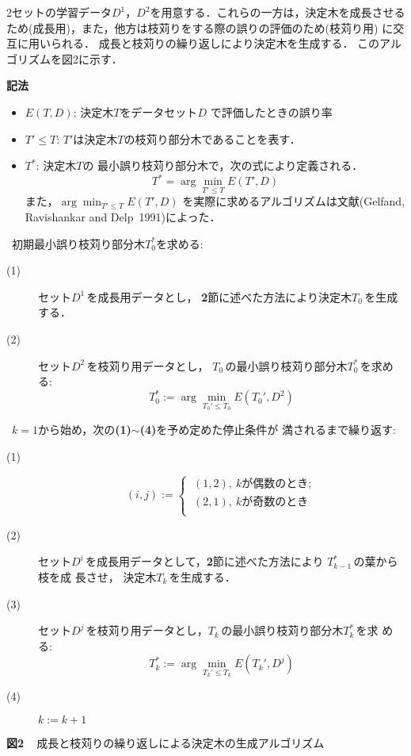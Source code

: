 2セットの学習データ$D^1$，$D^2$を用意する．これらの一方は，決定木を成長させる
ため(成長用)，また，他方は枝苅りをする際の誤りの評価のため(枝苅り用)
に交互に用いられる．
成長と枝苅りの繰り返しにより決定木を生成する．
このアルゴリズムを図2に示す．
\begin{table}
{\bf 記法}
\begin{itemize}
\item $E(T,D)$: 決定木$T$をデータセット$D$
で評価したときの誤り率
\item $T'\leq  T$: $T'$は決定木$T$の枝苅り部分木であることを表す．
\item $T^*$: 
決定木$T$の
最小誤り枝苅り部分木で，次の式により定義される．
\[T^*=\arg \min_{T' \leq T} E(T',D)\]
また，$\arg \min_{T' \leq T}E(T',D)$
を実際に求めるアルゴリズムは文献(Gelfand, Ravishankar  and Delp\ 1991)によった．
\vspace*{5mm}\\
\end{itemize}

\noindent {\bf [初期化]}\ 初期最小誤り枝苅り部分木$T_0^*$を求める:
\begin{description}
\item[(1)]セット$D^1$\,を成長用データとし，
{\bf 2}節に述べた方法により決定木$T_0$\,を生成する．
\item[(2)]セット$D^2$\,を枝苅り用データとし，
  $T_0$\,の最小誤り枝苅り部分木$T_0^*$\,を求める: 
   \[T_0^*:=\arg \min_{T_0' \leq T_0} E(T_0',D^2) \]
\end{description}
\noindent {\bf [繰り返し]}\ $k=1$から始め，次の{\bf (1)}$\sim${\bf (4)}を予め定めた停止条件が
満されるまで繰り返す:
\begin{description}
\item[(1)]   
  \[(i,j):=\left\{\begin{array}{ll}
\ (1,2), \ k が偶数のとき;\\      
\ (2,1), \ k が奇数のとき\\ 
\end{array}
\right.
\]
\item[(2)]セット$D^i$\,を成長用データとして，{\bf 2}節に述べた方法により
$T_{k-1}^*$\,の葉から枝を成
長させ，
決定木$T_k$\,を生成する．
\item[(3)]
セット$D^j$\,を枝苅り用データとし，$T_k$\,の最小誤り枝苅り部分木$T_k^*$\,を求
める: 
  \[T_k^*:=\arg \min_{T_k' \leq T_k} E(T_k',D^j) \]
\item[(4)]$k:=k+1$
\end{description}
\begin{center} 
{\bf 図2\ \ }成長と枝苅りの繰り返しによる決定木の生成アルゴリズム\vspace*{4mm}
\end{center}
\end{table}
